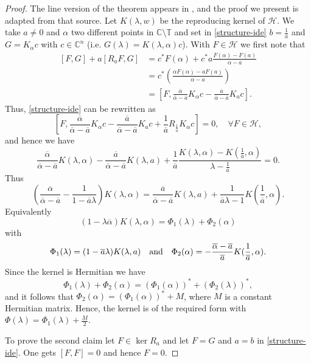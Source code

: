 \documentclass[12pt]{amsart}
\theoremstyle{definition}
\theoremstyle{remark}
\numberwithin{equation}{section}
\begin{document}
        \begin{proof}
The line version of the theorem appears in \cite[p. 13]{dbbook}, and the proof we present is adapted from that source. Let $K({\lambda},w)$ be the reproducing kernel of $\mathcal H$.
 We take $a\not=0$ and $\alpha$ two different points in $\mathbb C\setminus\mathbb T$ and
set in  \eqref{structure-ide}    $b=\frac{1}{\overline{a}}$ and     $G=K_\alpha c$ with $c\in\mathbb C^n$ (i.e. $G({\lambda})=K({\lambda},\alpha)c$). With $F\in\mathcal H$  we first note that
\[
\begin{split}
  [F,G]+a[R_aF,G]&=c^*F(\alpha)+c^*a\frac{F(\alpha)-F(a)}{\alpha-a}\\
  &=c^*\left(\frac{\alpha F(\alpha)-aF(a)}{\alpha-a}\right)\\
  &=[F,\frac{\overline{\alpha}}{\overline{\alpha}-\overline{a}}K_\alpha c-\frac{\overline{a}}{\overline{\alpha}-\overline{a}}K_a c].
  \end{split}
  \]
  Thus, \eqref{structure-ide} can be rewritten as
  \[
    [F, \frac{\overline{\alpha}}{\overline{\alpha}-\overline{a}}K_\alpha c-\frac{\overline{a}}{\overline{\alpha}-\overline{a}}K_a c+\frac{1}{\overline{a}}
    R_{\frac{1}{\overline{a}}}      K_\alpha c]=0,\quad\forall F\in\mathcal H,
    \]
    and hence we have
    \[
      \frac{\overline{\alpha}}{\overline{\alpha}-\overline{a}}      K({\lambda},\alpha) -\frac{\overline{a}}{\overline{\alpha}-\overline{a}}K({\lambda},a) +\frac{1}{\overline{a}}
\frac{K({\lambda},\alpha)-K(\frac{1}{\overline{a}},\alpha)}{{\lambda}-\frac{1}{\overline{a}}}=0.
  \]
  Thus
  \[
    \left(\frac{\overline{\alpha}}{\overline{\alpha}-\overline{a}}-\frac{1}{1-\overline{a}{\lambda}}\right)K({\lambda},\alpha)=
\frac{\overline{a}}{\overline{\alpha}-\overline{a}}K({\lambda},a) +\frac{1}{\overline{a}{\lambda}-1}K(\frac{1}{\overline{a}},\alpha).
    \]
    Equivalently
    \[
(1-{\lambda}\overline{\alpha})K({\lambda},\alpha)=\Phi_1({\lambda})+\Phi_2(\alpha)
      \]
      with
      \begin{equation}
          \Phi_1({\lambda})=(1-\overline{a}{\lambda})K({\lambda},a)\quad{\rm and}\quad
          \Phi_2(\alpha)=-\frac{  \overline{\alpha}-\overline{a}}{\overline{a}} K(\frac{1}{\overline{a}},\alpha).
        \end{equation}
        Since the kernel is Hermitian we have
        \[
\Phi_1({\lambda})+\Phi_2(\alpha)=(\Phi_1(\alpha))^*+(\Phi_2({\lambda}))^*,
\]
and it follows that $\Phi_2(\alpha)=(\Phi_1(\alpha))^*+M$, where $M$ is a constant Hermitian matrix. Hence, the kernel is of the required form with $\Phi({\lambda})=\Phi_1({\lambda})
+\frac{M}{2}$.\smallskip

          To prove the second claim let $F\in\ker R_a$ and let $F=G$ and $a=b$ in \eqref{structure-ide}.
          One gets $[F,F]=0$ and hence $F=0$.
          \end{proof}
\end{document}
